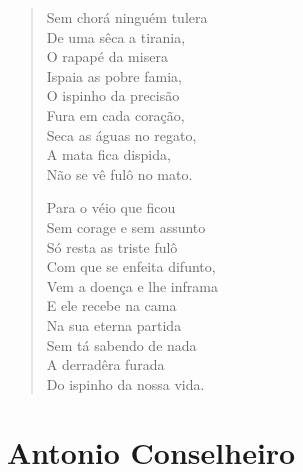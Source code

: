 \begin{verse}
Sem chorá ninguém tulera\\
De uma sêca a tirania,\\
O rapapé da misera\\
Ispaia as pobre famia,\\
O ispinho da precisão\\
Fura em cada coração,\\
Seca as águas no regato,\\
A mata fica dispida,\\
Não se vê fulô no mato.

Para o véio que ficou\\
Sem corage e sem assunto\\
Só resta as triste fulô\\
Com que se enfeita difunto,\\
Vem a doença e lhe inframa\\
E ele recebe na cama\\
Na sua eterna partida\\
Sem tá sabendo de nada\\
A derradêra furada\\
Do ispinho da nossa vida.
\end{verse}

\chapter{Antonio Conselheiro}


